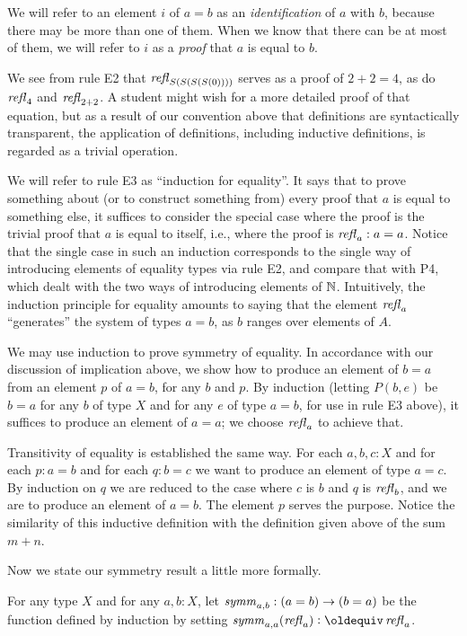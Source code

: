 We will refer to an element $i$ of $a=b$ as an {\em identification} of $a$ with $b$, because there may be more than one of them.  When we know
that there can be at most of them, we will refer to $i$ as a {\em proof} that $a$ is equal to $b$.

We see from rule E2 that $\mathop{{\it refl}_{S(S(S(S(0))))}}$ serves as a proof of $2+2=4$, as do $\mathop{{\it refl}_{4}}$ and $\mathop{{\it refl}_{2+2}}$.  A student might wish for a
more detailed proof of that equation, but as a result of our convention above that definitions are syntactically transparent, the application of
definitions, including inductive definitions, is regarded as a trivial operation.

We will refer to rule E3 as ``induction for equality''.  It says that to prove something about (or to construct something from) every proof that
$a$ is equal to something else, it suffices to consider the special case where the proof is the trivial proof that $a$ is equal to itself, i.e.,
where the proof is $\mathop{{\it refl}_{a}} : a=a$.  Notice that the single case in such an induction corresponds to the single way of introducing elements of
equality types via rule E2, and compare that with P4, which dealt with the two ways of introducing elements of $\mathbb{N}$.
Intuitively, the induction principle for equality amounts to saying that the element $\mathop{{\it refl}_{a}}$ ``generates'' the system of types $a=b$, as $b$
ranges over elements of $A$.

We may use induction to prove symmetry of equality.  In accordance with our discussion of implication above, we show how to produce an element
of $b=a$ from an element $p$ of $a=b$, for any $b$ and $p$.  By induction (letting $P(b,e)$ be $b=a$ for any $b$ of type $X$ and for any $e$ of
type $a=b$, for use in rule E3 above), it suffices to produce an element of $a=a$; we choose $\mathop{{\it refl}_{a}}$ to achieve that.

Transitivity of equality is established the same way.  For each $a,b,c:X$ and for each $p:a=b$ and for each $q:b=c$ we want to produce an
element of type $a=c$.  By induction on $q$ we are reduced to the case where $c$ is $b$ and $q$ is $\mathop{{\it refl}_{b}}$, and we are to produce an element
of $a=b$.  The element $p$ serves the purpose.  Notice the similarity of this inductive definition with the definition given above of the sum
$m+n$.

Now we state our symmetry result a little more formally.

\begin{definition}
  For any type $X$ and for any $a,b:X$, let $\mathop{\mathit{symm}}_{a,b} : (a=b) \to (b=a)$ be the function defined by induction by setting
  $\symm_{a,a}(\refl a) \defeq \refl a$.
\end{definition}

